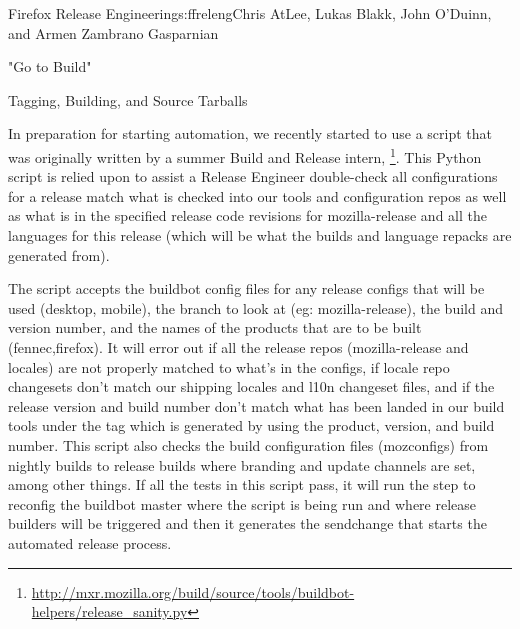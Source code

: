 \begin{aosachapter}{Firefox Release Engineering}{s:ffreleng}{Chris AtLee, Lukas Blakk, John O'Duinn, and Armen Zambrano Gasparnian}
\begin{aosasect1}{"Go to Build"}
\end{aosasect1}

\begin{aosasect1}{Tagging, Building, and Source Tarballs}

    
In preparation for starting automation, we recently started to use a
script that was originally written by a summer Build and Release
intern,
\footnote{\url{http://mxr.mozilla.org/build/source/tools/buildbot-helpers/release_sanity.py}}. This
Python script is relied upon to assist a Release Engineer double-check
all configurations for a release match what is checked into our tools
and configuration repos as well as what is in the specified release
code revisions for mozilla-release and all the languages for this
release (which will be what the builds and language repacks are
generated from).

The script accepts the buildbot config files for any release configs
that will be used (desktop, mobile), the branch to look at (eg:
mozilla-release), the build and version number, and the names of the
products that are to be built (fennec,firefox). It will error out if
all the release repos (mozilla-release and locales) are not properly
matched to what's in the configs, if locale repo changesets don't
match our shipping locales and l10n changeset files, and if the
release version and build number don't match what has been landed in
our build tools under the tag which is generated by using the product,
version, and build number. This script also checks the build
configuration files (mozconfigs) from nightly builds to release builds
where branding and update channels are set, among other things. If all
the tests in this script pass, it will run the step to reconfig the
buildbot master where the script is being run and where release
builders will be triggered and then it generates the sendchange that
starts the automated release process.


\end{aosasect1}
\end{aosachapter}
